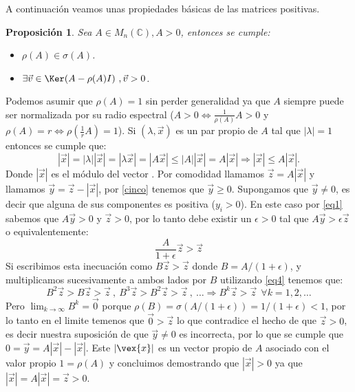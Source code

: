 \documentclass[size=a4, parskip=half, titlepage=false, toc=flat, toc=bib, 12pt]{scrartcl}
\makeatletter
\renewenvironment{proof}[1][\proofname] {\par\pushQED{\qed}\normalfont\topsep6\p@\@plus6\p@\relax\trivlist\item[\hskip\labelsep\itshape\tgpaella#1\@addpunct{.}]\ignorespaces}{\popQED\endtrivlist\@endpefalse}
\theoremstyle{theorem-style}
\newtheorem{nprop}{Proposición}[section]
\theoremstyle{definition-style}
\theoremstyle{remark-style}
\theoremstyle{example-style}
\theoremstyle{definition-style}
\theoremstyle{remark-style}
\makeatother
\begin{document}
A continuación veamos unas propiedades básicas de las matrices positivas.

\begin{nprop}
\label{existevector}
Sea $A \in M_n(\mathbb{C}), A > 0$, entonces se cumple:
\begin{itemize}
\item $\rho(A) \in \sigma(A)$.
\item $\exists \vec{v} \in \Ker(A - \rho(A) I) \ , \vec{v} > 0$.
\end{itemize}
\end{nprop}
\begin{proof}
Podemos asumir que $\rho(A) = 1$ sin perder generalidad ya que $A$ siempre puede ser normalizada por su radio espectral ($A >0 \Leftrightarrow \frac{1}{\rho(A)} A > 0$ y $\rho(A) = r \Leftrightarrow \rho(\frac{1}{r}A) = 1$). Si $(\lambda, \vec{x})$ es un par propio de $A$ tal que $|\lambda| = 1$ entonces se cumple que:
\begin{equation} \label{cinco} |\vec{x}| = |\lambda||\vec{x}| = |\lambda \vec{x}| = |A \vec{x}| \leq |A||\vec{x}| = A |\vec{x}| \Rightarrow |\vec{x}| \leq A |\vec{x}|.  \end{equation}
Donde $|\vec{x}|$ es el módulo del vector . Por comodidad llamamos $\vec{z} = A |\vec{x}|$ y llamamos $\vec{y} = \vec{z} - |\vec{x}|$, por \ref{cinco} tenemos que $\vec{y} \geq 0$. Supongamos que $\vec{y} \neq 0$, es decir que alguna de sus componentes es positiva ($y_i > 0$). En este caso por \ref{eq1} sabemos que $A \vec{y} > 0$ y $\vec{z} > 0$, por lo tanto debe existir un $\epsilon >0$ tal que $A\vec{y} > \epsilon \vec{z}$ o equivalentemente:
$$\frac{A}{1 + \epsilon} \vec{z} > \vec{z} $$
Si escribimos esta inecuación como $B \vec{z} > \vec{z}$ donde $B = A /(1 + \epsilon)$, y multiplicamos sucesivamente a ambos lados por $B$ utilizando \ref{eq4} tenemos que:
$$B^2 \vec{z} > B \vec{z} > \vec{z} \ , \ B^3 \vec{z} > B^2 \vec{z} > \vec{z} \ , \ \dots \Rightarrow B^k \vec{z} > \vec{z} \ \ \forall k = 1, 2, \dots $$
Pero $\lim_{k \to \infty}B^k = \vec{0}$ porque $\rho(B) = \sigma(A/(1 + \epsilon)) = 1/(1 + \epsilon) < 1$, por lo tanto en el limite temenos que $\vec{0} > \vec{z}$ lo que contradice el hecho de que $\vec{z} >0$, es decir nuestra suposición de que $\vec{y} \neq 0$ es incorrecta, por lo que se cumple que $0 = \vec{y} = A |\vec{x}| - |\vec{x}|$. Este $|\vex{x}|$ es un vector propio de $A$ asociado con el valor propio $1 = \rho(A)$ y concluimos demostrando que $|\vec{x}|>0$ ya que $|\vec{x}| = A |\vec{x}| = \vec{z} > 0$.
\end{proof}
\end{document}
